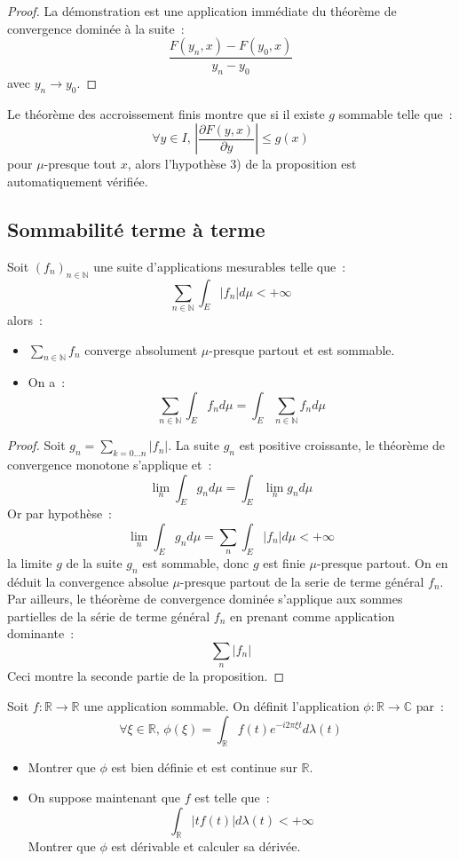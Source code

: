\begin{proof}
La démonstration est une application immédiate du théorème de
convergence dominée à la suite~:
\[
\frac{F(y_n,x)-F(y_0,x)}{y_n -y_0}
\]
avec $y_n \to y_0$.
\end{proof}
\begin{rem}
Le théorème des accroissement finis montre que si il existe $g$
sommable telle que~:
\[
\forall y \in I, \, \left |
\frac{\partial F(y,x)}{\partial y} 
\right | \leq g(x)
\]
pour $\mu$-presque tout $x$, alors l'hypothèse 3) de la proposition
est automatiquement vérifiée. 
\end{rem}
\subsection{Sommabilité terme à terme}
Soit $(f_n)_{n \in \mathbb{N}}$ une suite d'applications mesurables
telle que~:
\[
\sum_{n \in \mathbb{N}} \int_E |f_n| d \mu < +\infty
\]
alors~:
\begin{itemize}
\item $\sum_{n \in \mathbb{N}} f_n$ converge absolument $\mu$-presque
  partout et est som\-mable.
\item On a~:
\[
\sum_{n \in \mathbb{N}} \int_E f_n d \mu = \int_E \sum_{n \in
  \mathbb{N}} f_n d \mu 
\]
\end{itemize}
\begin{proof}
Soit $g_n = \sum_{k = 0 \dots n} |f_n|$. La suite $g_n$ est
positive croissante, le théorème de convergence monotone s'applique
et~:
\[
\lim_n \int_E g_n d \mu = \int_E \lim_n g_n d \mu 
\]
Or par hypothèse~:
\[
\lim_n \int_E g_n d \mu = \sum_n \int_E |f_n| d \mu < +\infty
\]
la limite $g$ de la suite $g_n$ est sommable, donc $g$ est finie
$\mu$-presque partout. On en déduit la convergence absolue
$\mu$-presque partout de la serie de terme général $f_n$.
Par ailleurs, le théorème de convergence dominée s'applique aux sommes
partielles de la série de terme général $f_n$ en prenant comme application
dominante~:
\[
\sum_n |f_n|
\]
Ceci montre la seconde partie de la proposition.
\end{proof}
\begin{exercice}
Soit $f : \mathbb{R} \to \mathbb{R}$ une application sommable. On 
définit l'application $\phi : \mathbb{R} \to \mathbb{C}$ par~:
\[
\forall \xi \in \mathbb{R}, \, \phi(\xi) = \int_{\mathbb{R}} f(t) e^{-i 2 \pi \xi t} d \lambda(t)
\]
\begin{itemize}
\item Montrer que $\phi$ est bien définie et est continue sur $\mathbb{R}$.
\item On suppose maintenant que $f$ est telle que~:
\[
\int_{\mathbb{R}} | t f(t) | d \lambda(t) < +\infty
\]
Montrer que $\phi$ est dérivable et calculer sa dérivée.
\end{itemize}
\end{exercice}
